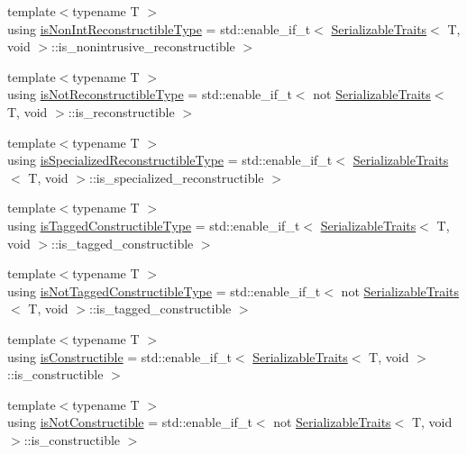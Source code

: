 \begin{DoxyCompactItemize}
\item 
{\footnotesize template$<$typename T $>$ }\\using \hyperlink{namespacecheckpoint_a46b7909fb0fef92b4787567fde7c760b}{is\+Non\+Int\+Reconstructible\+Type} = std\+::enable\+\_\+if\+\_\+t$<$ \hyperlink{structcheckpoint_1_1_serializable_traits}{Serializable\+Traits}$<$ T, void $>$\+::is\+\_\+nonintrusive\+\_\+reconstructible $>$
\item 
{\footnotesize template$<$typename T $>$ }\\using \hyperlink{namespacecheckpoint_a0054cbef71b90d6860e1d3916cf9d299}{is\+Not\+Reconstructible\+Type} = std\+::enable\+\_\+if\+\_\+t$<$ not \hyperlink{structcheckpoint_1_1_serializable_traits}{Serializable\+Traits}$<$ T, void $>$\+::is\+\_\+reconstructible $>$
\item 
{\footnotesize template$<$typename T $>$ }\\using \hyperlink{namespacecheckpoint_a30b2672bbbe0c21d2b88edb1ddaec19a}{is\+Specialized\+Reconstructible\+Type} = std\+::enable\+\_\+if\+\_\+t$<$ \hyperlink{structcheckpoint_1_1_serializable_traits}{Serializable\+Traits}$<$ T, void $>$\+::is\+\_\+specialized\+\_\+reconstructible $>$
\item 
{\footnotesize template$<$typename T $>$ }\\using \hyperlink{namespacecheckpoint_abff0f367c546c94ce857d200153d990f}{is\+Tagged\+Constructible\+Type} = std\+::enable\+\_\+if\+\_\+t$<$ \hyperlink{structcheckpoint_1_1_serializable_traits}{Serializable\+Traits}$<$ T, void $>$\+::is\+\_\+tagged\+\_\+constructible $>$
\item 
{\footnotesize template$<$typename T $>$ }\\using \hyperlink{namespacecheckpoint_a4eb64ee16bff7ef1609e5b98cb16cfb6}{is\+Not\+Tagged\+Constructible\+Type} = std\+::enable\+\_\+if\+\_\+t$<$ not \hyperlink{structcheckpoint_1_1_serializable_traits}{Serializable\+Traits}$<$ T, void $>$\+::is\+\_\+tagged\+\_\+constructible $>$
\item 
{\footnotesize template$<$typename T $>$ }\\using \hyperlink{namespacecheckpoint_a48ec2649d5cbd890f67ea1193cc0d51a}{is\+Constructible} = std\+::enable\+\_\+if\+\_\+t$<$ \hyperlink{structcheckpoint_1_1_serializable_traits}{Serializable\+Traits}$<$ T, void $>$\+::is\+\_\+constructible $>$
\item 
{\footnotesize template$<$typename T $>$ }\\using \hyperlink{namespacecheckpoint_a14b3c81988a2c2d3c935edcc653b6322}{is\+Not\+Constructible} = std\+::enable\+\_\+if\+\_\+t$<$ not \hyperlink{structcheckpoint_1_1_serializable_traits}{Serializable\+Traits}$<$ T, void $>$\+::is\+\_\+constructible $>$

\end{DoxyCompactItemize}
